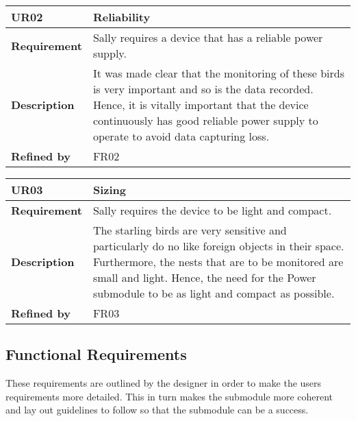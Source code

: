 \documentclass[class=report,11pt,crop=false]{standalone}
\begin{document}
 

\begin{table}
\centering

\begin{tabular}{|>{\raggedright\arraybackslash}p{0.2\linewidth}|>{\raggedright\arraybackslash}p{0.8\linewidth}|}
\hline
\textbf{UR02} & \textbf{Reliability} \\
\hline
\textbf{Requirement} & Sally requires a device that has a reliable power supply.  \\
\hline
\textbf{Description} & It was made clear that the monitoring of these birds is very important and so is the data recorded. Hence, it is vitally important that the device continuously has good reliable power supply to operate to avoid data capturing loss. \\
\hline
\textbf{Refined by} & FR02 \\
\hline

\end{tabular}

\end{table}

 

\begin{table}
\centering

\begin{tabular}{|>{\raggedright\arraybackslash}p{0.2\linewidth}|>{\raggedright\arraybackslash}p{0.8\linewidth}|}
\hline
\textbf{UR03} & \textbf{Sizing} \\
\hline
\textbf{Requirement} & Sally requires the device to be light and compact. \\
\hline
\textbf{Description} & The starling birds are very sensitive and particularly do no like foreign objects in their space. Furthermore, the nests that are to be monitored are small and light. Hence, the need for the Power submodule to be as light and compact as possible. \\
\hline
\textbf{Refined by} & FR03 \\
\hline

\end{tabular}

\end{table}

 

\subsection{Functional Requirements}

These requirements are outlined by the designer in order to make the users requirements more detailed. This in turn makes the submodule more coherent and lay out guidelines to follow so that the submodule can be a success.
\end{document}
